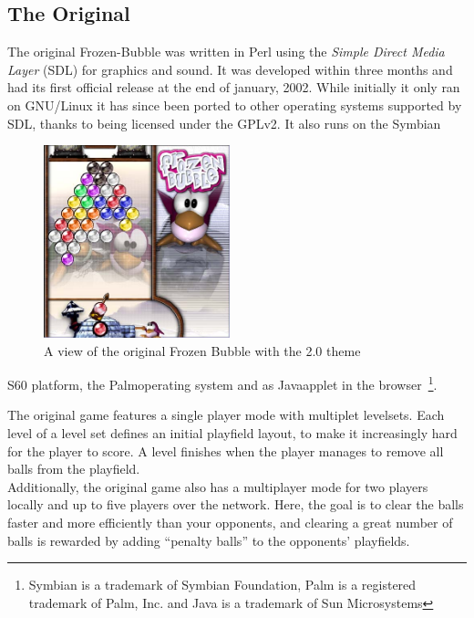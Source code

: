 \subsection{The Original}
The original Frozen-Bubble was written in Perl using the \emph{Simple Direct Media Layer} (SDL)
for graphics and sound. It was developed within three months and had its first official 
release at the end of january, 2002. While initially it only ran on GNU/Linux it has since
been ported to other operating systems supported by SDL, thanks to being licensed under the GPLv2.
It also runs on the Symbian\trademark
\begin{figure}
\vspace{-2em}
  \begin{center}
    \includegraphics[width=0.48\textwidth]{images/screenshot1}
  \end{center}
  \caption{A view of the original Frozen Bubble with the 2.0 theme}
\vspace{-2em}
\end{figure}
S60 platform, the Palm\registered operating system and as Java\trademark applet in the 
browser~\footnote{Symbian is a trademark of Symbian Foundation, Palm is a registered trademark 
of Palm, Inc. and Java is a trademark of Sun Microsystems}.

The original game features a single player mode with multiplet levelsets. Each level 
of a level set defines an initial playfield layout, to make it increasingly hard for 
the player to score. A level finishes when the player manages to remove all balls 
from the playfield.\\
Additionally, the original game also has a multiplayer mode for two players 
locally and up to five players over the network. Here, the goal is to clear the balls 
faster and more efficiently than your opponents, and clearing a great number of balls 
is rewarded by adding ``penalty balls'' to the opponents' playfields.
%
